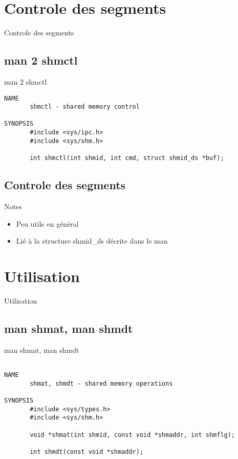 \def\sectitle{Controle des segments}
\section{\sectitle}
\begin{frame}[containsverbatim]{\sectitle}
\def\subsectitle{man 2 shmctl}
\subsection{\subsectitle}
\begin{block}{\subsectitle}
\begin{verbatim}
NAME
       shmctl - shared memory control

SYNOPSIS
       #include <sys/ipc.h>
       #include <sys/shm.h>

       int shmctl(int shmid, int cmd, struct shmid_ds *buf);

\end{verbatim}
\end{block}

\def\subsectitle{Notes}
\subsection{\sectitle}
\begin{block}{\subsectitle}
\begin{itemize}
    \item Peu utile en général
    \item Lié à la structure shmid\_ds décrite dans le man
\end{itemize}
\end{block}
\end{frame}

\def\sectitle{Utilisation}
\section{\sectitle}
\begin{frame}[containsverbatim]{\sectitle}
\def\subsectitle{man shmat, man shmdt}
\subsection{\subsectitle}
\begin{block}{\subsectitle}
\begin{verbatim}

NAME
       shmat, shmdt - shared memory operations

SYNOPSIS
       #include <sys/types.h>
       #include <sys/shm.h>

       void *shmat(int shmid, const void *shmaddr, int shmflg);

       int shmdt(const void *shmaddr);
\end{verbatim}
\end{block}
\end{frame}


